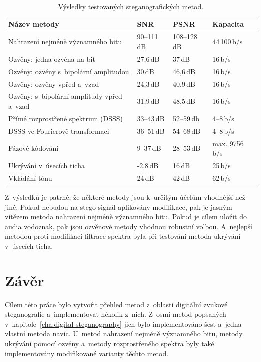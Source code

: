 \begin{table}[H]
    \vskip6pt
    \caption{Výsledky testovaných steganografických metod.}
    \vskip6pt
    \centering
    \begin{tabular}{llll}
        \toprule
        Název metody & SNR & PSNR & Kapacita \\
        \midrule
        Nahrazení nejméně významného bitu          & 90--111\,dB & 108--128\,dB & 44\,100\,b/s \\
        Ozvěny: jedna ozvěna na bit                & 27,6\,dB    & 37\,dB       & 16\,b/s \\
        Ozvěny: ozvěny s~bipolární amplitudou      & 30\,dB      & 46,6\,dB     & 16\,b/s \\
        Ozvěny: ozvěny vpřed a~vzad                & 24,3\,dB    & 40,9\,dB     & 16\,b/s \\
        Ozvěny: s~bipolární amplitudy vpřed a~vzad & 31,9\,dB    & 48,5\,dB     & 16\,b/s \\
        Přímé rozprostřené spektrum (DSSS)         & 33--43\,dB  & 52--59\,db   & 4--8\,b/s \\
        DSSS ve Fourierově transformaci            & 36--51\,dB  & 54--68\,dB   & 4--8\,b/s \\
        Fázové kódování                            & 9--37\,dB   & 28--53\,dB   & max. 9756\,b/s \\
        Ukrývání v~úsecích ticha                   & -2,8\,dB    & 16\,dB       & 25\,b/s \\
        Vkládání tónu                              & 24\,dB      & 42\,dB       & 62\,b/s \\
        \bottomrule
    \end{tabular}
    \label{tab:results-summary}
\end{table}

Z~výsledků je patrné, že některé metody jsou k~určitým účelům vhodnější než
jiné. Pokud nebudou na stego signál aplikovány modifikace, pak je jasným
vítězem metoda nahrazení nejméně významného bitu. Pokud je cílem uložit do
audia vodoznak, pak jsou ozvěnové metody vhodnou robustní volbou. A~nejlepší
metodou proti modifikaci filtrace spektra byla při testování metoda ukrývání
v~úsecích ticha.


\chapter{Závěr}
\label{cha:conclusion}

Cílem této práce bylo vytvořit přehled metod z~oblasti digitální zvukové
steganografie a~implementovat několik z~nich. Z~osmi metod popsaných
v~kapitole~\ref{cha:digital-steganography} jich bylo implementováno šest
a~jedna vlastní metoda navíc. U~metod nahrazení nejméně významného bitu, metody
ukrývání pomocí ozvěny a~metody rozprostřeného spektra byly také implementovány
modifikované varianty těchto metod.

